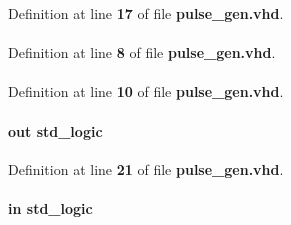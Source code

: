 Definition at line {\bf 17} of file {\bf pulse\+\_\+gen.\+vhd}.

\paragraph[{ieee}]{\hspace{0.3cm}{\ttfamily [Library]}}\label{classpulse__gen_a0a6af6eef40212dbaf130d57ce711256}


Definition at line {\bf 8} of file {\bf pulse\+\_\+gen.\+vhd}.

\paragraph[{numeric\+\_\+std}]{\hspace{0.3cm}{\ttfamily [Package]}}\label{classpulse__gen_a2edc34402b573437d5f25fa90ba4013e}


Definition at line {\bf 10} of file {\bf pulse\+\_\+gen.\+vhd}.

\paragraph[{pulse}]{ {\bfseries \textcolor{keywordflow}{out}\textcolor{vhdlchar}{ }} {\bfseries \textcolor{comment}{std\+\_\+logic}\textcolor{vhdlchar}{ }} \hspace{0.3cm}{\ttfamily [Port]}}\label{classpulse__gen_ae2328becd935ad4618403649a15be751}


Definition at line {\bf 21} of file {\bf pulse\+\_\+gen.\+vhd}.

\paragraph[{reset\+\_\+n}]{ {\bfseries \textcolor{keywordflow}{in}\textcolor{vhdlchar}{ }} {\bfseries \textcolor{comment}{std\+\_\+logic}\textcolor{vhdlchar}{ }} \hspace{0.3cm}{\ttfamily [Port]}}\label{classpulse__gen_a446ea52ed8c4a84181a47d9165ce41a5}


